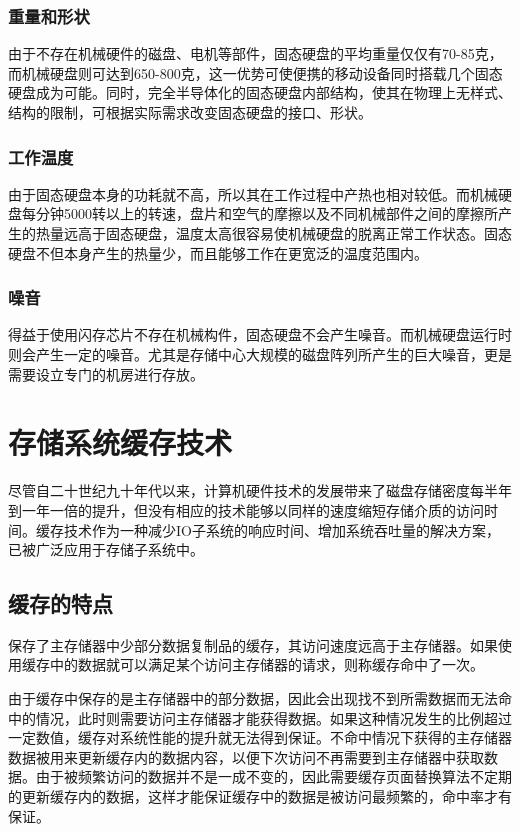 \subsubsection{重量和形状}
由于不存在机械硬件的磁盘、电机等部件，固态硬盘的平均重量仅仅有70-85克，而机械硬盘则可达到650-800克，这一优势可使便携的移动设备同时搭载几个固态硬盘成为可能。同时，完全半导体化的固态硬盘内部结构，使其在物理上无样式、结构的限制，可根据实际需求改变固态硬盘的接口、形状。

\subsubsection{工作温度}
由于固态硬盘本身的功耗就不高，所以其在工作过程中产热也相对较低。而机械硬盘每分钟5000转以上的转速，盘片和空气的摩擦以及不同机械部件之间的摩擦所产生的热量远高于固态硬盘，温度太高很容易使机械硬盘的脱离正常工作状态。固态硬盘不但本身产生的热量少，而且能够工作在更宽泛的温度范围内。

\subsubsection{噪音}
得益于使用闪存芯片不存在机械构件，固态硬盘不会产生噪音。而机械硬盘运行时则会产生一定的噪音。尤其是存储中心大规模的磁盘阵列所产生的巨大噪音，更是需要设立专门的机房进行存放。

\section{存储系统缓存技术}
\label{sec:storage_cache_tech}

尽管自二十世纪九十年代以来，计算机硬件技术的发展带来了磁盘存储密度每半年到一年一倍的提升，但没有相应的技术能够以同样的速度缩短存储介质的访问时间。缓存技术\cite{cache2011}作为一种减少IO子系统的响应时间、增加系统吞吐量的解决方案，已被广泛应用于存储子系统中。

\subsection{缓存的特点}
保存了主存储器中少部分数据复制品的缓存，其访问速度远高于主存储器。如果使用缓存中的数据就可以满足某个访问主存储器的请求，则称缓存命中了一次。

由于缓存中保存的是主存储器中的部分数据，因此会出现找不到所需数据而无法命中的情况，此时则需要访问主存储器才能获得数据。如果这种情况发生的比例超过一定数值，缓存对系统性能的提升就无法得到保证。不命中情况下获得的主存储器数据被用来更新缓存内的数据内容，以便下次访问不再需要到主存储器中获取数据。由于被频繁访问的数据并不是一成不变的，因此需要缓存页面替换算法不定期的更新缓存内的数据，这样才能保证缓存中的数据是被访问最频繁的，命中率才有保证。


